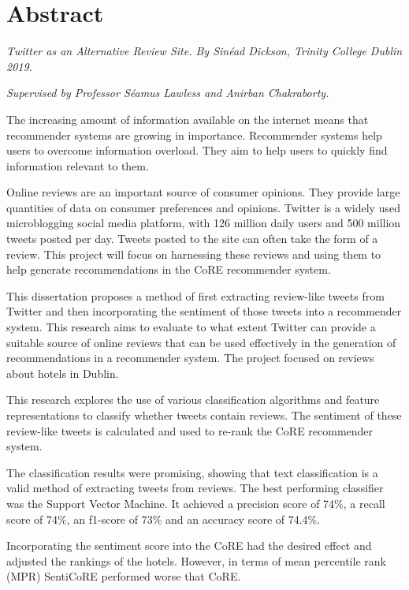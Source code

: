 \chapter{Abstract}

\emph{Twitter as an Alternative Review Site. By Sinéad Dickson, Trinity College Dublin 2019.}

\emph{Supervised by Professor Séamus Lawless and Anirban Chakraborty.}

The increasing amount of information available on the internet means that recommender systems are growing in importance. Recommender systems help users to overcome information overload. They aim to help users to quickly find information relevant to them.

Online reviews are an important source of consumer opinions. They provide large quantities of data on consumer preferences and opinions. Twitter is a widely used microblogging social media platform, with 126 million daily users and 500 million tweets posted per day. Tweets posted to the site can often take the form of a review. This project will focus on harnessing these reviews and using them to help generate recommendations in the CoRE recommender system.

This dissertation proposes a method of first extracting review-like tweets from Twitter and then incorporating the sentiment of those tweets into a recommender system. This research aims to evaluate to what extent Twitter can provide a suitable source of online reviews that can be used effectively in the generation of recommendations in a recommender system. The project focused on reviews about hotels in Dublin.

This research explores the use of various classification algorithms and feature representations to classify whether tweets contain reviews. The sentiment of these review-like tweets is calculated and used to re-rank the CoRE recommender system.

The classification results were promising, showing that text classification is a valid method of extracting tweets from reviews. The best performing classifier was the Support Vector Machine. It achieved a precision score of 74\%, a recall score of 74\%, an f1-score of 73\% and an accuracy score of 74.4\%.

Incorporating the sentiment score into the CoRE had the desired effect and adjusted the rankings of the hotels. However, in terms of mean percentile rank (MPR) SentiCoRE performed worse that CoRE. 








